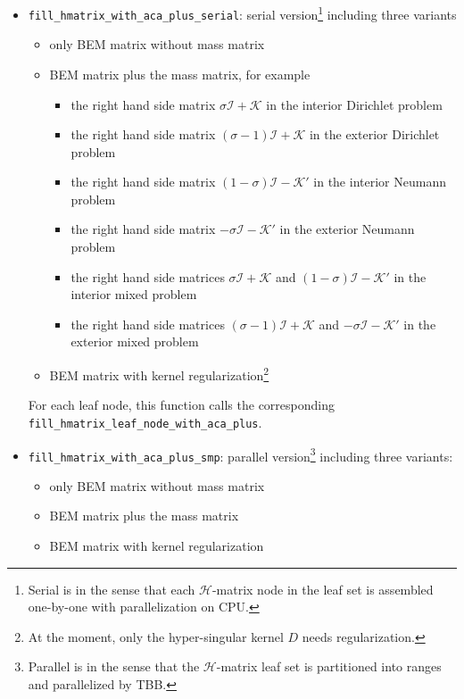 \documentclass[11pt, a4paper]{book}
\begin{document}
\begin{itemize}
\item \texttt{fill\_hmatrix\_with\_aca\_plus\_serial}: serial version\footnote{Serial is in the
    sense that each $\mathcal{H}$-matrix node in the leaf set is assembled one-by-one with
    parallelization on CPU.} including three variants
  \begin{itemize}
  \item only BEM matrix without mass matrix
  \item BEM matrix plus the mass matrix, for example
    \begin{itemize}
    \item the right hand side matrix $\sigma\mathscr{I}+\mathscr{K}$ in the interior
      Dirichlet problem
    \item the right hand side matrix $(\sigma-1)\mathscr{I}+\mathscr{K}$ in the exterior Dirichlet
      problem
    \item the right hand side matrix $(1-\sigma)\mathscr{I}-\mathscr{K}'$ in the interior Neumann
      problem
    \item the right hand side matrix $-\sigma \mathscr{I}-\mathscr{K}'$ in the exterior Neumann problem
    \item the right hand side matrices $\sigma \mathscr{I}+\mathscr{K}$ and
      $(1-\sigma)\mathscr{I}-\mathscr{K}'$ in the interior mixed problem
    \item the right hand side matrices $(\sigma-1)\mathscr{I}+\mathscr{K}$ and $-\sigma
      \mathscr{I}-\mathscr{K}'$ in the exterior mixed problem
    \end{itemize}
  \item BEM matrix with kernel regularization\footnote{At the moment, only the hyper-singular
      kernel $D$ needs regularization.}
  \end{itemize}
  For each leaf node, this function calls the corresponding \texttt{fill\_hmatrix\_leaf\_node\_with\_aca\_plus}.
\item \texttt{fill\_hmatrix\_with\_aca\_plus\_smp}: parallel version\footnote{Parallel is
    in the sense that the $\mathcal{H}$-matrix leaf set is partitioned into ranges and
    parallelized by TBB.} including three variants:
  \begin{itemize}
  \item only BEM matrix without mass matrix
  \item BEM matrix plus the mass matrix
  \item BEM matrix with kernel regularization
  \end{itemize}

\end{itemize}
\end{document}
